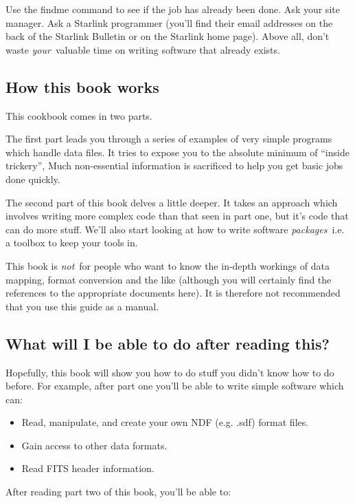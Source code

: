 Use the {\sf findme} command  to see if the job 
has already been done.
Ask your site manager. Ask a Starlink programmer (you'll find their email
addresses on the back of the Starlink Bulletin or on the Starlink home
page). Above all, don't waste {\em your}\, valuable time on writing software
that already exists.
 
\subsection{How this book works}

This cookbook comes in two parts.

The first part leads you through a series of examples of very simple
programs which handle data files. 
It tries to expose you to the absolute minimum
of ``inside trickery'', 
Much non-essential information is sacrificed 
to help you get basic jobs done quickly.

The second part of this book delves a little deeper.  It takes an approach
which involves writing more complex code than that seen in part one, but
it's code that can do more stuff. We'll also start looking at how to write
software {\em packages}\, i.e. a toolbox to keep your tools in.

This book is {\em not}\, for people who want to know the in-depth workings
of data mapping, format conversion and the like (although you will
certainly find the references to the appropriate documents here).  It is
therefore not recommended that you use this guide as a manual.

\subsection{What will I be able to do after reading this?}

Hopefully, this book will show you how to do stuff you didn't know how to do
before. For example, after part one you'll be able to write simple
software which can:

\begin{itemize}
\item Read, manipulate, and create your own NDF (e.g. .sdf) format files.
\item Gain access to other data formats.
\item Read FITS header information.
\end{itemize}

After reading part two of this book, you'll be able to:

